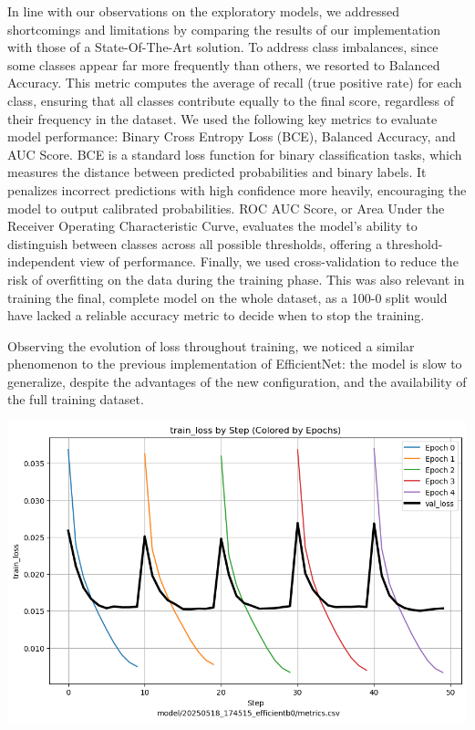 \documentclass[11pt]{article}
\begin{document}
In line with our observations on the exploratory models, we addressed shortcomings and limitations by comparing the results of our implementation with those of a State-Of-The-Art solution. To address class imbalances, since some classes appear far more frequently than others, we resorted to Balanced Accuracy. This metric computes the average of recall (true positive rate) for each class, ensuring that all classes contribute equally to the final score, regardless of their frequency in the dataset. We used the following key metrics to evaluate model performance: Binary Cross Entropy Loss (BCE), Balanced Accuracy, and AUC Score. BCE is a standard loss function for binary classification tasks, which measures the distance between predicted probabilities and binary labels. It penalizes incorrect predictions with high confidence more heavily, encouraging the model to output calibrated probabilities. ROC AUC Score, or Area Under the Receiver Operating Characteristic Curve, evaluates the model's ability to distinguish between classes across all possible thresholds, offering a threshold-independent view of performance. Finally, we used cross-validation to reduce the risk of overfitting on the data during the training phase. This was also relevant in training the final, complete model on the whole dataset, as a 100-0 split would have lacked a reliable accuracy metric to decide when to stop the training.

\begin{minipage}{0.60\linewidth}
  Observing the evolution of loss throughout training, we noticed a similar phenomenon to the previous implementation of EfficientNet: the model is slow to generalize, despite the advantages of the new configuration, and the availability of the full training dataset.
\end{minipage}
\hfill
\begin{minipage}{0.35\linewidth}
  \includegraphics[width=\linewidth]{img/efficientb_loss_kfold.png}
\end{minipage}
\end{document}
